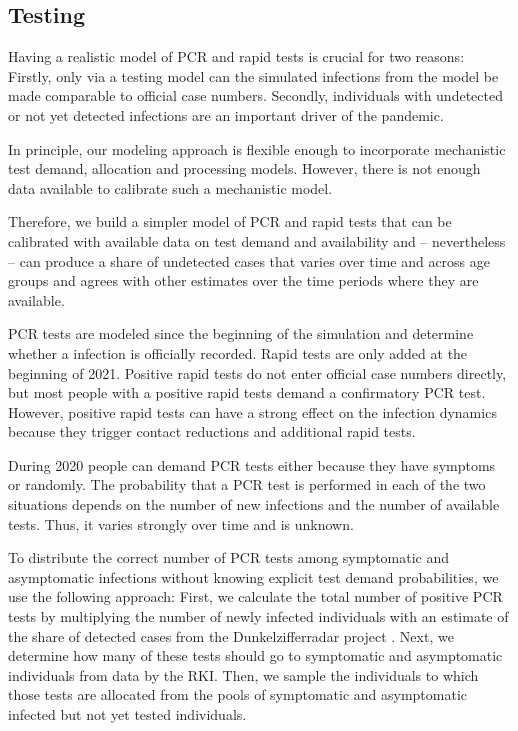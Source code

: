 \subsection{Testing} %
\label{sub:testing}

Having a realistic model of PCR and rapid tests is crucial for two reasons: Firstly, only
via a testing model can the simulated infections from the model be made comparable to
official case numbers. Secondly, individuals with undetected or not yet detected
infections are an important driver of the pandemic.

In principle, our modeling approach is flexible enough to incorporate mechanistic test
demand, allocation and processing models. However, there is not enough data available to
calibrate such a mechanistic model.

Therefore, we build a simpler model of PCR and rapid tests that can be calibrated with
available data on test demand and availability and -- nevertheless
-- can produce a share of undetected cases that varies over time and across age groups
and agrees with other estimates over the time periods where they are available.

PCR tests are modeled since the beginning of the simulation and determine whether a
infection is officially recorded. Rapid tests are only added at the beginning of 2021.
Positive rapid tests do not enter official case numbers directly, but most people with a
positive rapid tests demand a confirmatory PCR test. However, positive rapid tests can
have a strong effect on the infection dynamics because they trigger contact reductions
and additional rapid tests.

During 2020 people can demand PCR tests either because they have symptoms or randomly.
The probability that a PCR test is performed in each of the two situations depends on the
number of new infections and the number of available tests. Thus, it varies strongly over
time and is unknown.

To distribute the correct number of PCR tests among symptomatic and asymptomatic
infections without knowing explicit test demand probabilities, we use the following
approach: First, we calculate the total number of positive PCR tests by multiplying the
number of newly infected individuals with an estimate of the share of detected cases
from the Dunkelzifferradar project \citep{Dunkelzifferradar2020}. Next, we determine how
many of these tests should go to symptomatic and asymptomatic individuals from data by
the RKI. Then, we sample the individuals to which those tests
are allocated from the pools of symptomatic and asymptomatic infected but not yet tested
individuals.

